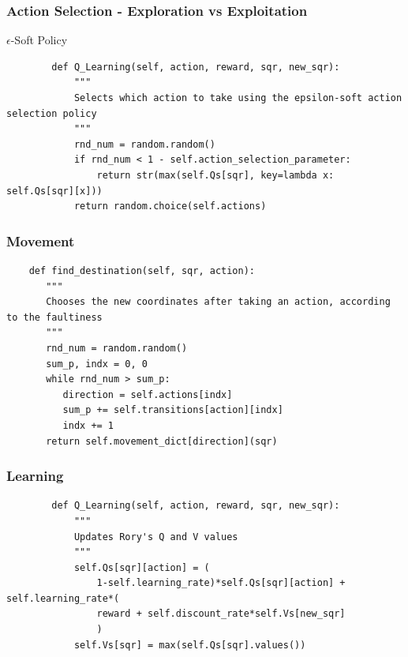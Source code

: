 \documentclass{beamer}
\begin{document}
  \begin{frame}[fragile]
	\frametitle{Action Selection - Exploration vs Exploitation}
	\begin{center}
	$\epsilon$-Soft Policy
	\end{center}

	\begin{lstlisting}
		def Q_Learning(self, action, reward, sqr, new_sqr):
		    """
		    Selects which action to take using the epsilon-soft action selection policy
		    """
		    rnd_num = random.random()
		    if rnd_num < 1 - self.action_selection_parameter:
		        return str(max(self.Qs[sqr], key=lambda x: self.Qs[sqr][x]))
		    return random.choice(self.actions)
	\end{lstlisting}
\end{frame}

  \begin{frame}[fragile]
	\frametitle{Movement}

	\begin{lstlisting}
	def find_destination(self, sqr, action):
	   """
	   Chooses the new coordinates after taking an action, according to the faultiness
	   """
	   rnd_num = random.random()
	   sum_p, indx = 0, 0
	   while rnd_num > sum_p:
	      direction = self.actions[indx]
	      sum_p += self.transitions[action][indx]
	      indx += 1
	   return self.movement_dict[direction](sqr)
	\end{lstlisting}
\end{frame}
  

  
  \begin{frame}[fragile]
	\frametitle{Learning}

	\begin{lstlisting}
		def Q_Learning(self, action, reward, sqr, new_sqr):
		    """
		    Updates Rory's Q and V values
		    """
		    self.Qs[sqr][action] = (
		        1-self.learning_rate)*self.Qs[sqr][action] + self.learning_rate*(
		        reward + self.discount_rate*self.Vs[new_sqr]
		        )
		    self.Vs[sqr] = max(self.Qs[sqr].values())
	\end{lstlisting}
\end{frame}
  
\end{document}

